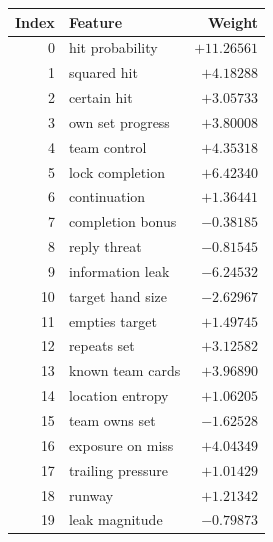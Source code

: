 \begin{tabular}{rlr}
\toprule
Index & Feature & Weight \\
\midrule
0 & hit probability & $+11.26561$ \\
1 & squared hit & $+4.18288$ \\
2 & certain hit & $+3.05733$ \\
3 & own set progress & $+3.80008$ \\
4 & team control & $+4.35318$ \\
5 & lock completion & $+6.42340$ \\
6 & continuation & $+1.36441$ \\
7 & completion bonus & $-0.38185$ \\
8 & reply threat & $-0.81545$ \\
9 & information leak & $-6.24532$ \\
10 & target hand size & $-2.62967$ \\
11 & empties target & $+1.49745$ \\
12 & repeats set & $+3.12582$ \\
13 & known team cards & $+3.96890$ \\
14 & location entropy & $+1.06205$ \\
15 & team owns set & $-1.62528$ \\
16 & exposure on miss & $+4.04349$ \\
17 & trailing pressure & $+1.01429$ \\
18 & runway & $+1.21342$ \\
19 & leak magnitude & $-0.79873$ \\
\bottomrule
\end{tabular}
